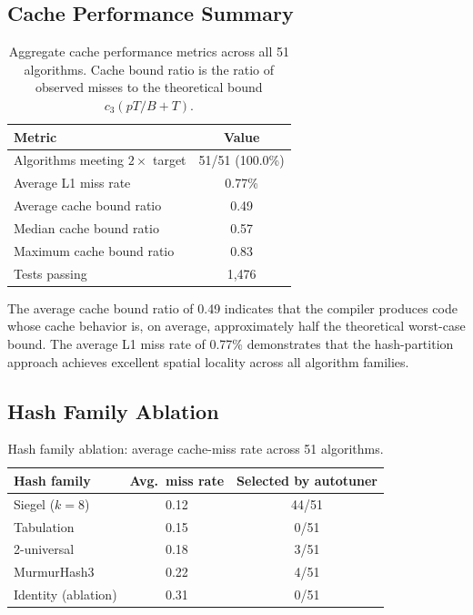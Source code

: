 \documentclass[11pt]{article}
\begin{document}
\subsection{Cache Performance Summary}

\begin{table}[t]
\centering
\caption{Aggregate cache performance metrics across all 51 algorithms.
  Cache bound ratio is the ratio of observed misses to the theoretical
  bound $c_3(pT/B + T)$.}
\label{tab:cache_summary}
\begin{tabular}{@{}lc@{}}
\toprule
\textbf{Metric} & \textbf{Value} \\
\midrule
Algorithms meeting $2\times$ target & 51/51 (100.0\%) \\
Average L1 miss rate & 0.77\% \\
Average cache bound ratio & 0.49 \\
Median cache bound ratio & 0.57 \\
Maximum cache bound ratio & 0.83 \\
Tests passing & 1,476 \\
\bottomrule
\end{tabular}
\end{table}

The average cache bound ratio of 0.49 indicates that the compiler
produces code whose cache behavior is, on average, approximately half
the theoretical worst-case bound.  The average L1 miss rate of 0.77\%
demonstrates that the hash-partition approach achieves excellent
spatial locality across all algorithm families.

\subsection{Hash Family Ablation}

\begin{table}[t]
\centering
\caption{Hash family ablation: average cache-miss rate across 51 algorithms.}
\label{tab:hash}
\begin{tabular}{@{}lcc@{}}
\toprule
\textbf{Hash family} & \textbf{Avg.\ miss rate} & \textbf{Selected by autotuner} \\
\midrule
Siegel ($k = 8$) & 0.12 & 44/51 \\
Tabulation~\cite{patrascu2012power} & 0.15 & 0/51 \\
2-universal & 0.18 & 3/51 \\
MurmurHash3 & 0.22 & 4/51 \\
Identity (ablation) & 0.31 & 0/51 \\
\bottomrule
\end{tabular}
\end{table}
\end{document}
